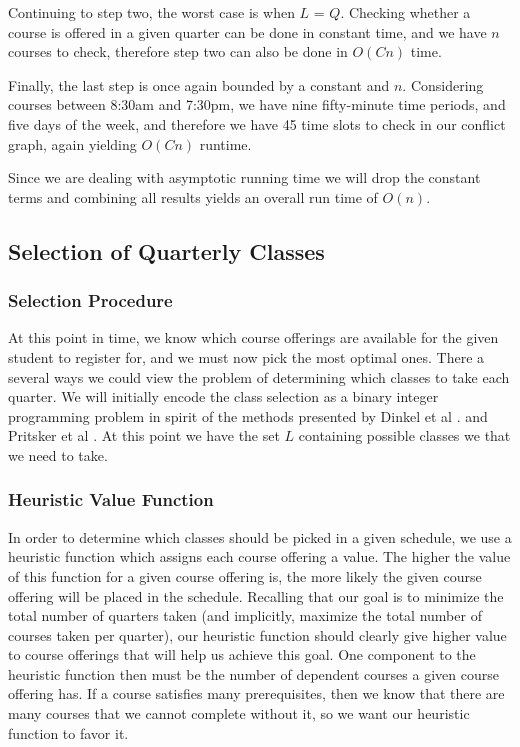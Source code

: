 \documentclass[11pt]{article} %
\begin{document}
Continuing to step two, the worst case is when $L$ = $Q$. Checking whether
a course is offered in a given quarter can be done in constant time, and we have
$n$ courses to check, therefore step two can also be done in $O(Cn)$ time.

Finally, the last step is once again bounded by a constant and $n$. Considering
courses between 8:30am and 7:30pm, we have nine fifty-minute time periods, and
five days of the week, and therefore we have 45 time slots to check in our
conflict graph, again yielding $O(Cn)$ runtime.

Since we are dealing with asymptotic running time we will drop the constant
terms and combining all results yields an overall run time of $O(n)$.

\subsection{Selection of Quarterly Classes} \subsubsection{Selection Procedure}
At this point in time, we know which course offerings are available for the
given student to register for, and we must now pick the most optimal ones. There
a several ways we could view the problem of determining which classes to take
each quarter. We will initially encode the class selection as a binary integer
programming problem in spirit of the methods presented by Dinkel et al
\cite{dinel:scheduling}. and Pritsker et al \cite{prisker:informs}. At this
point we have the set $L$ containing possible classes we that we need to take.

\subsubsection{Heuristic Value Function} In order to determine which classes
should be picked in a given schedule, we use a heuristic function which assigns
each course offering a value. The higher the value of this function for a given
course offering is, the more likely the given course offering will be placed in
the schedule. Recalling that our goal is to minimize the total number of
quarters taken (and implicitly, maximize the total number of courses taken per
quarter), our heuristic function should clearly give higher value to course
offerings that will help us achieve this goal. One component to the heuristic
function then must be the number of dependent courses a given course offering
has. If a course satisfies many prerequisites, then we know that there are many
courses that we cannot complete without it, so we want our heuristic function to
favor it. 
\end{document}
